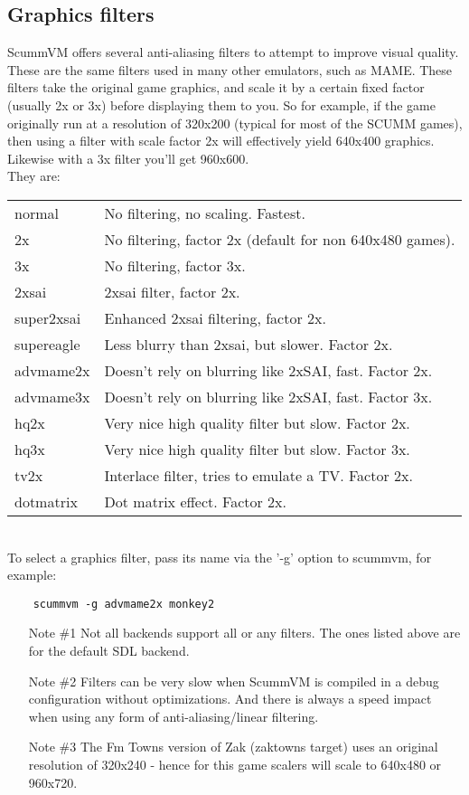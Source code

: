 

\subsection {Graphics filters}
ScummVM offers several anti-aliasing filters to attempt to improve visual
quality. These are the same filters used in many other emulators, such as
MAME. These filters take the original game graphics, and scale it by a 
certain fixed factor (usually 2x or 3x) before displaying them to you.
So for example, if the game originally run at a resolution of 320x200
(typical for most of the SCUMM games), then using a filter with scale
factor 2x will effectively yield 640x400 graphics. Likewise with a 
3x filter you'll get 960x600.\\
They are:\\
\begin{tabular}[h]{ll}
  normal     & No filtering, no scaling. Fastest.\\
  2x         & No filtering, factor 2x (default for non 640x480 games).\\
  3x         & No filtering, factor 3x.\\
  2xsai      & 2xsai filter, factor 2x.\\
  super2xsai & Enhanced 2xsai filtering, factor 2x.\\
  supereagle & Less blurry than 2xsai, but slower. Factor 2x.\\
  advmame2x  & Doesn't rely on blurring like 2xSAI, fast. Factor 2x.\\
  advmame3x  & Doesn't rely on blurring like 2xSAI, fast. Factor 3x.\\
  hq2x       & Very nice high quality filter but slow. Factor 2x.\\
  hq3x       & Very nice high quality filter but slow. Factor 3x.\\
  tv2x       & Interlace filter, tries to emulate a TV. Factor 2x.\\
  dotmatrix  & Dot matrix effect. Factor 2x.\\
\end{tabular}\\

To select a graphics filter, pass its name via the '-g' option to scummvm,
for example:

\begin{verbatim}
    scummvm -g advmame2x monkey2
\end{verbatim}
\begin{enumerate}
\item [Note \#1] Not all backends support all or any filters. The ones
  listed above are for the default SDL backend.
\item [Note \#2] Filters can be very slow when ScummVM is compiled in a
  debug configuration without optimizations. And there is always a
  speed impact when using any form of anti-aliasing/linear filtering.
\item [Note \#3] The Fm Towns version of Zak (zaktowns target) uses an
  original resolution of 320x240 - hence for this game scalers will
  scale to 640x480 or 960x720.
\end{enumerate}